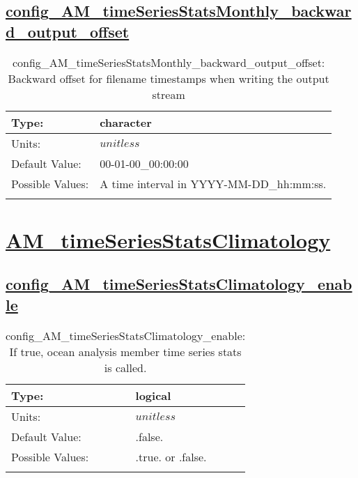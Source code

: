 \subsection[config\_AM\_timeSeriesStatsMonthly\_backward\_output\_offset]{\hyperref[sec:nm_tab_AM_timeSeriesStatsMonthly]{config\_AM\_timeSeriesStatsMonthly\_backward\_output\_offset}}
\label{subsec:nm_sec_config_AM_timeSeriesStatsMonthly_backward_output_offset}
\begin{center}
\begin{longtable}{| p{2.0in} || p{4.0in} |}
    \hline
    Type: & character \\
    \hline
    Units: & $unitless$ \\
    \hline
    Default Value: & 00-01-00\_00:00:00 \\
    \hline
    Possible Values: & A time interval in YYYY-MM-DD\_hh:mm:ss. \\
    \hline
    \caption{config\_AM\_timeSeriesStatsMonthly\_backward\_output\_offset: Backward offset for filename timestamps when writing the output stream}
\end{longtable}
\end{center}
\section[AM\_timeSeriesStatsClimatology]{\hyperref[sec:nm_tab_AM_timeSeriesStatsClimatology]{AM\_timeSeriesStatsClimatology}}
\label{sec:nm_sec_AM_timeSeriesStatsClimatology}
\subsection[config\_AM\_timeSeriesStatsClimatology\_enable]{\hyperref[sec:nm_tab_AM_timeSeriesStatsClimatology]{config\_AM\_timeSeriesStatsClimatology\_enable}}
\label{subsec:nm_sec_config_AM_timeSeriesStatsClimatology_enable}
\begin{center}
\begin{longtable}{| p{2.0in} || p{4.0in} |}
    \hline
    Type: & logical \\
    \hline
    Units: & $unitless$ \\
    \hline
    Default Value: & .false. \\
    \hline
    Possible Values: & .true. or .false. \\
    \hline
    \caption{config\_AM\_timeSeriesStatsClimatology\_enable: If true, ocean analysis member time series stats is called.}
\end{longtable}
\end{center}
